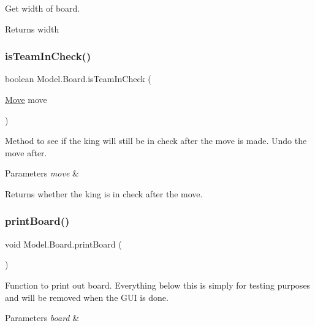 Get width of board. \begin{DoxyReturn}{Returns}
width 
\end{DoxyReturn}
\hypertarget{class_model_1_1_board_a9d041c45865ca1db8ff39c9f4fce204e}{}\label{class_model_1_1_board_a9d041c45865ca1db8ff39c9f4fce204e} 
\subsubsection{\texorpdfstring{is\+Team\+In\+Check()}{isTeamInCheck()}}
{\footnotesize\ttfamily boolean Model.\+Board.\+is\+Team\+In\+Check (\begin{DoxyParamCaption}\item[{\hyperlink{class_model_1_1_move}{Move}}]{move }\end{DoxyParamCaption})}

Method to see if the king will still be in check after the move is made. Undo the move after. 
\begin{DoxyParams}{Parameters}
{\em move} & \\
\hline
\end{DoxyParams}
\begin{DoxyReturn}{Returns}
whether the king is in check after the move. 
\end{DoxyReturn}
\hypertarget{class_model_1_1_board_a07633635c4378b1824a69deddfb521d5}{}\label{class_model_1_1_board_a07633635c4378b1824a69deddfb521d5} 
\subsubsection{\texorpdfstring{print\+Board()}{printBoard()}}
{\footnotesize\ttfamily void Model.\+Board.\+print\+Board (\begin{DoxyParamCaption}{ }\end{DoxyParamCaption})}

Function to print out board. Everything below this is simply for testing purposes and will be removed when the G\+UI is done. 
\begin{DoxyParams}{Parameters}
{\em board} & \\
\hline
\end{DoxyParams}
\hypertarget{class_model_1_1_board_a79dabcf1688b67bac808be8c67364bce}{}\label{class_model_1_1_board_a79dabcf1688b67bac808be8c67364bce} 
